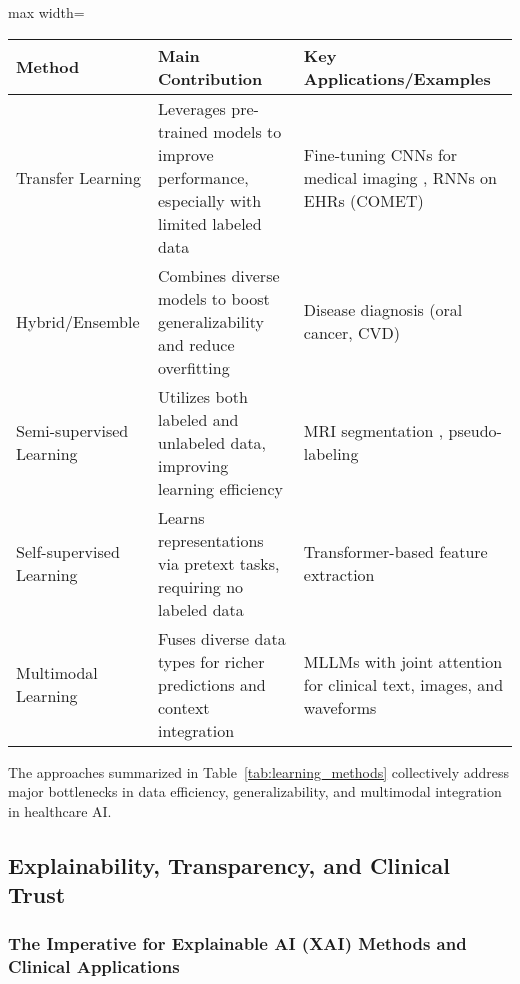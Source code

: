 \begin{table*}[htbp]
\centering
\caption{Overview of Learning Methods and Their Key Contributions in Healthcare}
\label{tab:learning_methods}
\begin{adjustbox}{max width=\textwidth}
\begin{tabular}{lll}
\toprule
\textbf{Method}      & \textbf{Main Contribution}                                        & \textbf{Key Applications/Examples} \\
\midrule
Transfer Learning    & Leverages pre-trained models to improve performance, especially with limited labeled data & Fine-tuning CNNs for medical imaging \cite{ref31, ref54, ref90}, RNNs on EHRs (COMET) \cite{ref49} \\
Hybrid/Ensemble      & Combines diverse models to boost generalizability and reduce overfitting                   & Disease diagnosis (oral cancer, CVD) \cite{ref53, ref71, ref90} \\
Semi-supervised Learning & Utilizes both labeled and unlabeled data, improving learning efficiency                  & MRI segmentation \cite{ref61, ref77}, pseudo-labeling \cite{ref76} \\
Self-supervised Learning & Learns representations via pretext tasks, requiring no labeled data                     & Transformer-based feature extraction \cite{ref41, ref55, ref106} \\
Multimodal Learning  & Fuses diverse data types for richer predictions and context integration                     & MLLMs with joint attention for clinical text, images, and waveforms \cite{ref31, ref49, ref76, ref106} \\
\bottomrule
\end{tabular}
\end{adjustbox}
\end{table*}

The approaches summarized in Table~\ref{tab:learning_methods} collectively address major bottlenecks in data efficiency, generalizability, and multimodal integration in healthcare AI.

\subsection{Explainability, Transparency, and Clinical Trust}

\subsubsection{The Imperative for Explainable AI (XAI) Methods and Clinical Applications}

